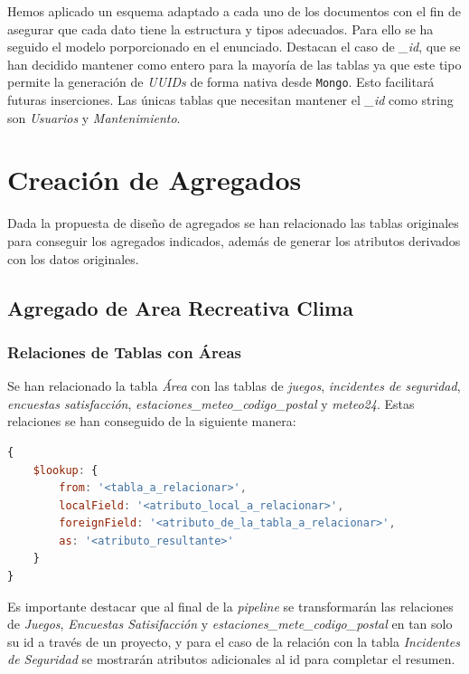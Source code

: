 \documentclass[]{article}
\begin{document}
Hemos aplicado un esquema adaptado a cada uno de los documentos con el fin de asegurar que cada dato tiene la estructura y tipos adecuados. Para ello se ha seguido el modelo porporcionado en el enunciado. Destacan el caso de \textit{\_id}, que se han decidido mantener como entero para la mayoría de las tablas ya que este tipo permite la generación de \textit{UUIDs} de forma nativa desde \texttt{Mongo}. Esto facilitará futuras inserciones. Las únicas tablas que necesitan mantener el \textit{\_id} como string son \textit{Usuarios} y \textit{Mantenimiento}. 


\newpage
\section{Creación de Agregados}
\label{sec:creacion_agregados}
Dada la propuesta de diseño de agregados se han relacionado las tablas originales para conseguir los agregados indicados, además de generar los atributos derivados con los datos originales.

\subsection{Agregado de Area Recreativa Clima}
\label{subsec:agregado_area}

\subsubsection{Relaciones de Tablas con Áreas}
\label{subsubsec:relaciones_area}

Se han relacionado la tabla \textit{Área} con las tablas de \textit{juegos}, \textit{incidentes de seguridad}, \textit{encuestas satisfacción}, \textit{estaciones\_meteo\_codigo\_postal} y \textit{meteo24}.
Estas relaciones se han conseguido de la siguiente manera:
\begin{lstlisting}[language=JavaScript, caption=Operadores para relacionar tablas en mongodb]
{
    $lookup: {
        from: '<tabla_a_relacionar>',
        localField: '<atributo_local_a_relacionar>',
        foreignField: '<atributo_de_la_tabla_a_relacionar>',
        as: '<atributo_resultante>'
    }
}
\end{lstlisting}

Es importante destacar que al final de la \textit{pipeline} se transformarán las relaciones de \textit{Juegos}, \textit{Encuestas Satisifacción} y \textit{estaciones\_mete\_codigo\_postal} en tan solo su id a través de un proyecto, y para el caso de la relación con la tabla \textit{Incidentes de Seguridad} se mostrarán atributos adicionales al id para completar el resumen.
\end{document}
